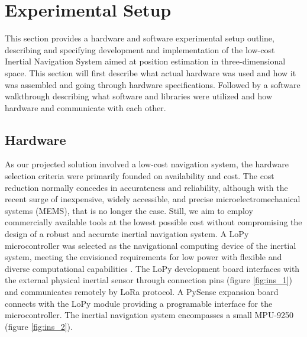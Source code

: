 \section{Experimental Setup}

This section provides a hardware and software experimental setup outline, describing and specifying development and implementation of the low-cost Inertial Navigation System aimed at position estimation in three-dimensional space. This section will first describe what actual hardware was used and how it was assembled and going through hardware specifications. Followed by a software walkthrough describing what software and libraries were utilized and how hardware and communicate with each other.

\subsection{Hardware}
\label{sub:setup}

As our projected solution involved a low-cost navigation system, the hardware selection criteria were primarily founded on availability and cost. The cost reduction normally concedes in accurateness and reliability, although with the recent surge of inexpensive, widely accessible, and precise microelectromechanical systems (MEMS), that is no longer the case. Still, we aim to employ commercially available tools at the lowest possible cost without compromising the design of a robust and accurate inertial navigation system. A LoPy microcontroller was selected as the navigational computing device of the inertial system, meeting the envisioned requirements for low power with flexible and diverse computational capabilities \cite{lopy}. The LoPy development board interfaces with the external physical inertial sensor through connection pins (figure \ref{fig:ins_1}) and communicates remotely by LoRa protocol. A PySense expansion board connects with the LoPy module providing a programable interface for the microcontroller. The inertial navigation system encompasses a small MPU-9250 (figure \ref{fig:ins_2}).

